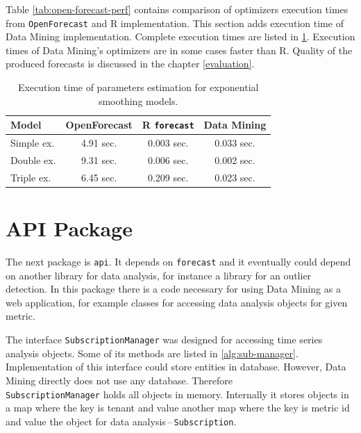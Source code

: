         Table \ref{tab:open-forecast-perf} contains comparison of optimizers execution times from \texttt{OpenForecast}
        and R implementation. This section adds execution time of Data Mining implementation. Complete execution times are
        listed in \ref{tab:datamining-perf}. Execution times of Data Mining's optimizers are in some cases faster than R.
        Quality of the produced forecasts is discussed in the chapter \ref{evaluation}.

        \begin{table}[h]
            \begin{center}
                \begin{tabular}{l|c|c|c}
                    \textbf{Model} & \textbf{OpenForecast} & \textbf{R \texttt{forecast}} &
                        \textbf{Data Mining}\\ \hline \hline
                    Simple ex. & 4.91 sec. & 0.003 sec. & 0.033 sec.\\
                    Double ex. & 9.31 sec. & 0.006 sec. & 0.002 sec. \\
                    Triple ex. & 6.45 sec. & 0.209 sec. & 0.023 sec. \\
                \end{tabular}
                \caption{Execution time of parameters estimation for exponential smoothing models.}
                \label{tab:datamining-perf}
            \end{center}
        \end{table}

    \section{API Package}
    The next package is \texttt{api}. It depends on \texttt{forecast} and it eventually could
    depend on another library for data analysis, for instance a library for an outlier detection. In this package there
    is a code necessary for using Data Mining as a web application, for example classes for accessing data analysis
    objects for given metric.

    The interface \texttt{SubscriptionManager} was designed for accessing time series analysis objects. Some of its
    methods are listed in \ref{alg:sub-manager}. Implementation of this interface could store entities in database.
    However, Data Mining directly does not use any database. Therefore \\ \texttt{SubscriptionManager} holds all objects
    in memory. Internally it stores objects in a map where the key is tenant and value another map where the key is
    metric id and value the object for data analysis\,--\,\texttt{Subscription}.


